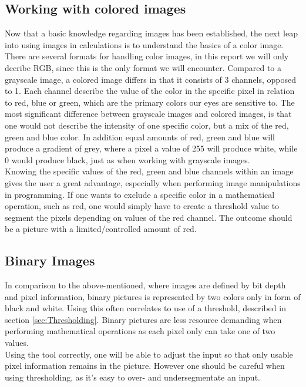 \subsection{Working with colored images}
Now that a basic knowledge regarding images has been established, the next leap into using images in calculations is to understand the basics of a color image.\\
There are several formats for handling color images, in this report we will only decribe RGB, since this is the only format we will encounter. Compared to a grayscale image, a colored image differs in that it consists of 3 channels, opposed to 1. Each channel describe the value of the color in the specific pixel in relation to red, blue or green, which are the primary colors our eyes are sensitive to. The most significant difference between grayscale images and colored images, is that one would not describe the intensity of one specific color, but a mix of the red, green and blue color. In addition equal amounts of red, green and blue  will produce a gradient of grey, where a pixel a value of 255 will produce white, while 0 would produce black, just as when working with grayscale images.\\
Knowing the specific values of the red, green and blue channels within an image gives the user a great advantage, especially when performing image manipulations in programming. If one wants to exclude a specific color in a mathematical operation, such as red, one would simply have to create a threshold value to segment the pixels depending on values of the red channel. The outcome should be a picture with a limited/controlled amount of red. 

\subsection{Binary Images}
In comparison to the above-mentioned, where images are defined by bit depth and pixel information, binary pictures is represented by two colors only in form of black and white. Using this often correlates to use of a threshold, described in section \ref{sec:Thresholding}. Binary pictures are less resource demanding when performing mathematical operations as each pixel only can take one of two values.\\
Using the tool correctly, one will be able to adjust the input so that only usable pixel information remains in the picture. However one should be careful when using thresholding, as it's easy to over- and undersegmentate an input.

